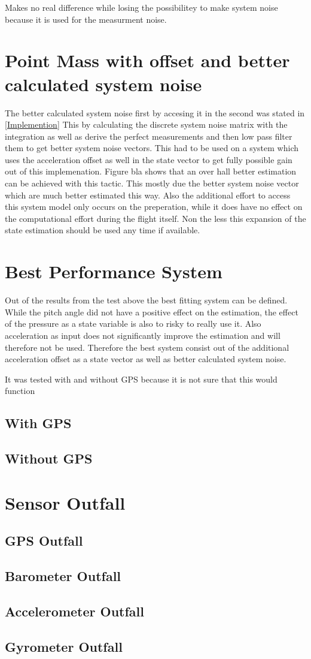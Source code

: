 Makes no real difference while losing the possibilitey to make system noise because it is used for the measurment noise.

\section{Point Mass with offset and better calculated system noise}
The better calculated system noise first by accesing it in the second was stated in \ref{Implemention}
This by calculating the discrete system noise matrix with the integration as well as
derive the perfect measurements and then low pass filter them to get better system noise vectors.
This had to be used on a system which uses the acceleration offset as well in the state vector to get fully possible gain out of this implemenation.
Figure bla shows that an over hall better estimation can be achieved with this tactic. 
This mostly due the better system noise vector which are much better estimated this way.
Also the additional effort to access this system model only occurs on the preperation,
while it does have no effect on the computational effort during the flight itself.
Non the less this expansion of the state estimation should be used any time if available.


\section{Best Performance System}
Out of the results from the test above the best fitting system can be defined.
While the pitch angle did not have a positive effect on the estimation, the effect of the pressure as a state variable is also to risky to really use it.
Also acceleration as input does not significantly improve the estimation and will therefore not be used.
Therefore the best system consist out of the additional acceleration offset as a state vector as well as better calculated system noise.

It was tested with and without GPS because it is not sure that this would function

\subsection{With GPS}

\subsection{Without GPS}


\section{Sensor Outfall}
\subsection{GPS Outfall}
\subsection{Barometer Outfall}
\subsection{Accelerometer Outfall}
\subsection{Gyrometer Outfall}